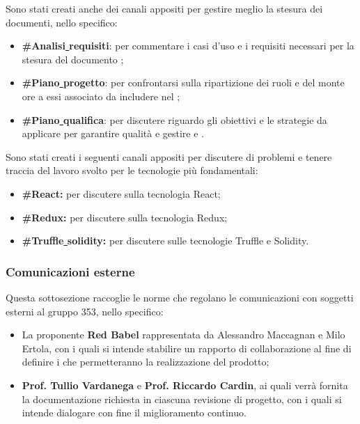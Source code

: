 \documentclass[NormeDiProgetto.tex]{subfiles}
\begin{document}
	Sono stati creati anche dei canali appositi per gestire meglio la stesura dei documenti, nello specifico:
	\begin{itemize}
		\item \textbf{\#Analisi\underline{ }requisiti}: per commentare i casi d'uso e i requisiti necessari per la stesura del documento \adr;
		\item \textbf{\#Piano\underline{ }progetto}: per confrontarsi sulla ripartizione dei ruoli e del monte ore a essi associato da includere nel \pdp;
		\item \textbf{\#Piano\underline{ }qualifica}: per discutere riguardo gli obiettivi e le strategie da applicare per garantire qualità e gestire  e .
	\end{itemize}
	
	Sono stati creati i seguenti canali appositi per discutere di problemi e tenere traccia del lavoro svolto per le tecnologie più fondamentali:
	\begin{itemize}
		\item \textbf{\#React:} per discutere sulla tecnologia React;
		\item \textbf{\#Redux:} per discutere sulla tecnologia Redux;
		\item \textbf{\#Truffle\underline{ }solidity:} per discutere sulle tecnologie Truffle e Solidity.
	\end{itemize}

	\subsubsection{Comunicazioni esterne}
	Questa sottosezione raccoglie le norme che regolano le comunicazioni con soggetti esterni al gruppo 353, nello specifico:
	\begin{itemize}
		\item La proponente \textbf{Red Babel} rappresentata da Alessandro Maccagnan e Milo Ertola, con i quali si intende stabilire un rapporto di collaborazione al fine di definire i  che permetteranno la realizzazione del prodotto;
		\item \textbf{Prof. Tullio Vardanega} e \textbf{Prof. Riccardo Cardin}, ai quali verrà fornita la documentazione richiesta in ciascuna revisione di progetto, con i quali si intende dialogare con fine il miglioramento continuo.
	\end{itemize}
\end{document}
